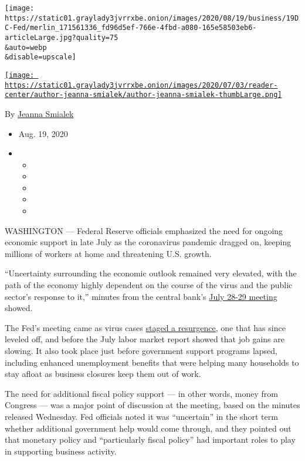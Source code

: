 \texttt{[image: https://static01.graylady3jvrrxbe.onion/images/2020/08/19/business/19DC-Fed/merlin\_171561336\_fd96d5ef-766e-4fbd-a080-165e58503eb6-articleLarge.jpg?quality=75\\\&auto=webp\\\&disable=upscale]}

\href{https://www.nytimes3xbfgragh.onion/by/jeanna-smialek}{\texttt{[image: https://static01.graylady3jvrrxbe.onion/images/2020/07/03/reader-center/author-jeanna-smialek/author-jeanna-smialek-thumbLarge.png]}}

By \href{https://www.nytimes3xbfgragh.onion/by/jeanna-smialek}{Jeanna
Smialek}

\begin{itemize}
\item
  Aug. 19, 2020
\item
  \begin{itemize}
  \item
  \item
  \item
  \item
  \item
  \end{itemize}
\end{itemize}

WASHINGTON --- Federal Reserve officials emphasized the need for ongoing
economic support in late July as the coronavirus pandemic dragged on,
keeping millions of workers at home and threatening U.S. growth.

``Uncertainty surrounding the economic outlook remained very elevated,
with the path of the economy highly dependent on the course of the virus
and the public sector's response to it,'' minutes from the central
bank's
\href{https://www.federalreserve.gov/monetarypolicy/fomccalendars.htm}{July
28-29 meeting} showed.

The Fed's meeting came as virus cases
\href{https://www.nytimes3xbfgragh.onion/interactive/2020/us/coronavirus-us-cases.html}{staged
a resurgence}, one that has since leveled off, and before the July labor
market report showed that job gains are slowing. It also took place just
before government support programs lapsed, including enhanced
unemployment benefits that were helping many households to stay afloat
as business closures keep them out of work.

The need for additional fiscal policy support --- in other words, money
from Congress --- was a major point of discussion at the meeting, based
on the minutes released Wednesday. Fed officials noted it was
``uncertain'' in the short term whether additional government help would
come through, and they pointed out that monetary policy and
``particularly fiscal policy'' had important roles to play in supporting
business activity.

